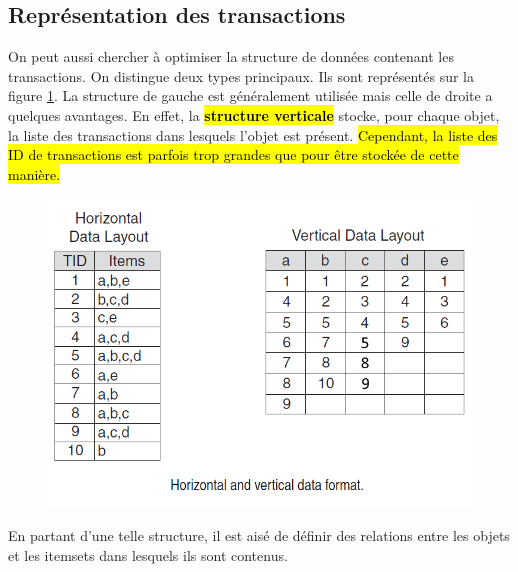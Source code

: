 \documentclass[letterpaper, 12pt]{article}
\newcommand{\alinea}{
\hspace*{0.5cm}}
\begin{document}
		\subsection{Représentation des transactions}
			\alinea On peut aussi chercher à optimiser la structure de 
				données contenant les transactions. On distingue deux
				types principaux. Ils sont représentés sur la figure 
				\ref{fig:transactions}. La structure de gauche est généralement
				utilisée mais celle de droite a quelques avantages. En effet,
				la \textbf{\hl{structure verticale}} stocke, pour chaque objet,
				la liste des transactions dans lesquels l'objet est présent.
				\hl{Cependant, la liste des ID de transactions est parfois
				trop grandes que pour être stockée de cette manière.}
			\begin{figure}[H]
				\centering
				\includegraphics[scale=0.425]{Images/transactions}
				\caption{}
				\label{fig:transactions}
			\end{figure}\noindent
			\alinea En partant d'une telle structure, il est aisé de définir
				des relations entre les objets et les itemsets dans lesquels
				ils sont contenus.	\\
			~\\
\end{document}
